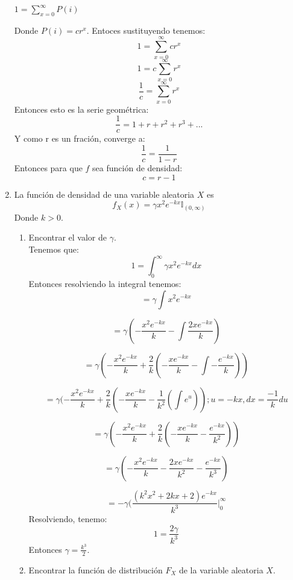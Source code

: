 \documentclass[12pt,a4paper]{report}
\begin{document}
\begin{enumerate}
{\begin{center}
			    $1 = \sum_{x=0}^{\infty} P(i)$
		    \end{center}
		    Donde $P(i) = cr^{x}$. Entoces sustituyendo tenemos:
		    \[1 = \sum_{x=0}^{\infty} cr^{x}\]
		    \[1 = c\sum_{x=0}^{\infty} r^{x}\]
		    \[\frac{1}{c} = \sum_{x=0}^{\infty} r^{x}\]
		    Entonces esto es la serie geométrica:
		    \[\frac{1}{c} = 1 + r + r^{2} + r^{3} + ...\]
		    Y como r es un fración, converge a:
		    \[\frac{1}{c} = \frac{1}{1-r}\]
		    Entonces para que $f$ sea función de densidad:
		    \[c = r-1\]
		}
		\item {
		La función de densidad de una variable aleatoria $X$ es
		\[f_X(x) = \gamma x^2 e^{-kx}\mathbb{I}_{(0, \infty)}\]
		Donde $k > 0$.
		\begin{enumerate}
			\item {
				Encontrar el valor de $\gamma$.\\
				Tenemos que:
    			\[1 = \int_{0}^{\infty} \gamma x^2 e^{-kx} dx\]
    			Entonces resolviendo la integral tenemos:
    			\[= \gamma \int x^{2}e^{-kx}\]

    			\[= \gamma (- \frac{x^{2}e^{-kx}}{k} - \int \frac{2xe^{-kx}}{k})\]

    			\[= \gamma (- \frac{x^{2}e^{-kx}}{k} + \frac{2}{k}(-\frac{xe^{-kx}}{k}- \int -
    				\frac{e^{-kx}}{k}))\]

    		    \[= \gamma (- \frac{x^{2}e^{-kx}}{k} + \frac{2}{k}(-\frac{xe^{-kx}}{k}- \frac{1}{k^{2}} ( \int e^{u})); u = -kx , dx = \frac{-1}{k}du\]

    			\[= \gamma (- \frac{x^{2}e^{-kx}}{k} + \frac{2}{k}(-\frac{xe^{-kx}}{k}- \frac{e^{-kx}}{k^{2}}))\]

    			\[= \gamma (- \frac{x^{2}e^{-kx}}{k} - \frac{2xe^{-kx}}{k^{2}}- \frac{e^{-kx}}{k^{3}})\]

    			\[ = -\gamma (\frac{(k^{2}x^{2} + 2kx + 2)e^{-kx}}{k^{3}}\Big|_0^\infty \]
    			Resolviendo, tenemo:
    			\[ 1 = \frac{2\gamma}{k^{3}}\]
    			Entonces $\gamma = \frac{k^{3}}{2}$.
			}
			\item {
				Encontrar la función de distribución $F_X$ de la variable aleatoria
				$X$.\\

}
\end{enumerate}}
\end{enumerate}
\end{document}

